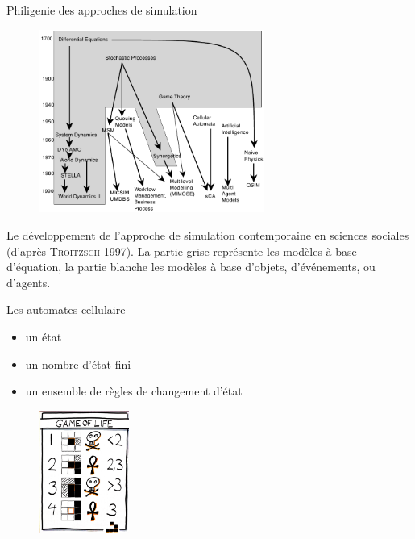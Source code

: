 \documentclass[newPxFont]{beamer}
\begin{document}
\begin{frame}[c]{Philigenie des approches de simulation}
\vspace{-2em}
\begin{figure}
 \includegraphics[height=6cm]{img/a_troitzsch_1997.png}
\end{figure}
\vspace{-0.8em}
\small{Le développement de l'approche de simulation contemporaine en sciences sociales (d'après \textsc{Troitzsch} 1997). La partie grise représente les modèles à base d'équation, la partie blanche les modèles à base d'objets, d'événements, ou d'agents}.
\end{frame}

\begin{frame}[c]{Les automates cellulaire}
\vspace{-2em}
\begin{itemize}
  \item un état
  \item un nombre d'état fini
  \item un ensemble de règles de changement d'état
\end{itemize}
\begin{figure}
 \includegraphics[height=4cm]{img/a_gameofliferules11.jpg}
\end{figure}
\vspace{-0.8em}
\end{frame}
\end{document}
